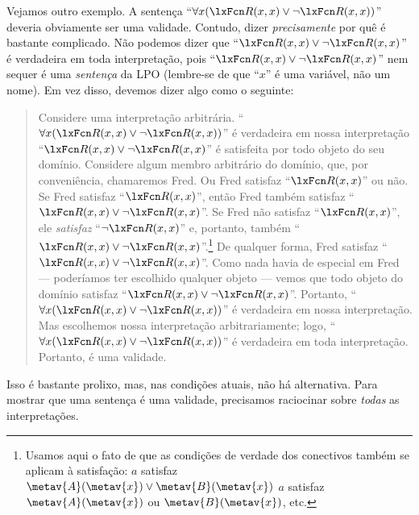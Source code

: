 Vejamos outro exemplo. A sentença \textquotedblleft $\forall x(\atom{R}{x,x}\eor\enot \atom{R}{x,x})$\textquotedblright{} deveria obviamente ser uma validade. Contudo, dizer \emph{precisamente} por quê é bastante complicado. Não podemos dizer que \textquotedblleft $\atom{R}{x,x} \eor\enot \atom{R}{x,x}$\textquotedblright{} é verdadeira em toda interpretação, pois \textquotedblleft $\atom{R}{x,x} \eor\enot \atom{R}{x,x}$\textquotedblright{} nem sequer é uma \emph{sentença} da LPO (lembre-se de que \textquotedblleft $x$\textquotedblright{} é uma variável, não um nome). Em vez disso, devemos dizer algo como o seguinte:
	\begin{quote}
Considere uma interpretação arbitrária. \textquotedblleft $\forall x(\atom{R}{x,x}\eor \enot\atom{R}{x,x})$\textquotedblright{} é verdadeira em nossa interpretação \ifeff{} \textquotedblleft $\atom{R}{x,x}\eor\enot\atom{R}{x,x}$\textquotedblright{} é satisfeita por todo objeto do seu domínio. Considere algum membro arbitrário do domínio, que, por conveniência, chamaremos Fred. Ou Fred satisfaz \textquotedblleft $\atom{R}{x,x}$\textquotedblright{} ou não. Se Fred satisfaz \textquotedblleft $\atom{R}{x,x}$\textquotedblright{}, então Fred também satisfaz \textquotedblleft $\atom{R}{x,x} \eor \enot \atom{R}{x,x}$\textquotedblright{}. Se Fred não satisfaz \textquotedblleft $\atom{R}{x,x}$\textquotedblright{}, ele \emph{satisfaz} \textquotedblleft $\enot\atom{R}{x,x}$\textquotedblright{} e, portanto, também \textquotedblleft $\atom{R}{x,x} \eor\enot \atom{R}{x,x}$\textquotedblright{}.\footnote{Usamos aqui o fato de que as condições de verdade dos conectivos também se aplicam à satisfação: $a$ satisfaz $\metav{A}(\metav{x}) \lor \metav{B}(\metav{x})$ \ifeff{} $a$ satisfaz $\metav{A}(\metav{x})$ ou $\metav{B}(\metav{x})$, etc.} De qualquer forma, Fred satisfaz \textquotedblleft $\atom{R}{x,x} \eor\enot \atom{R}{x,x}$\textquotedblright{}. Como nada havia de especial em Fred — poderíamos ter escolhido qualquer objeto — vemos que todo objeto do domínio satisfaz \textquotedblleft $\atom{R}{x,x} \eor\enot \atom{R}{x,x}$\textquotedblright{}. Portanto, \textquotedblleft $\forall x (\atom{R}{x,x} \eor\enot \atom{R}{x,x})$\textquotedblright{} é verdadeira em nossa interpretação. Mas escolhemos nossa interpretação arbitrariamente; logo, \textquotedblleft $\forall x (\atom{R}{x,x} \eor\enot \atom{R}{x,x})$\textquotedblright{} é verdadeira em toda interpretação. Portanto, é uma validade.
	\end{quote}
Isso é bastante prolixo, mas, nas condições atuais, não há alternativa. Para mostrar que uma sentença é uma validade, precisamos raciocinar sobre \emph{todas} as interpretações.


